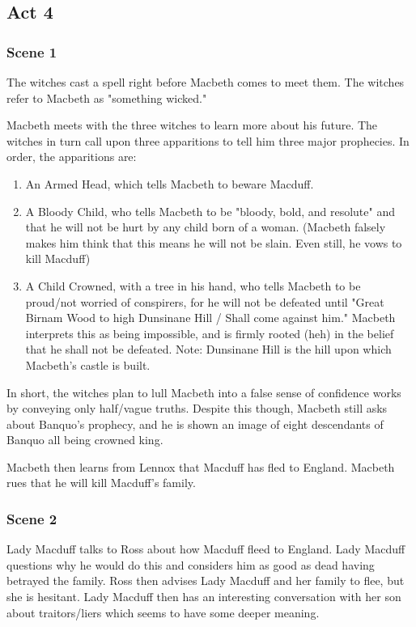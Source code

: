 \subsection{Act 4}

\subsubsection{Scene 1}

The witches cast a spell right before Macbeth comes to meet them. The witches refer to Macbeth as "something wicked."

Macbeth meets with the three witches to learn more about his future. The
witches in turn call upon three apparitions to tell him three major prophecies. In order, the apparitions are:
\begin{enumerate}
    \item An Armed Head, which tells Macbeth to beware Macduff.
    \item A Bloody Child, who tells Macbeth to be "bloody, bold, and resolute" and that he will not be hurt by any child born of a woman. (Macbeth falsely makes him think that this means he will not be slain. Even still, he vows to kill Macduff)
    \item A Child Crowned, with a tree in his hand, who tells Macbeth to be proud/not worried of conspirers, for he will not be defeated until "Great Birnam Wood to high Dunsinane Hill / Shall come against him." Macbeth interprets this as being impossible, and is firmly rooted (heh) in the belief that he shall not be defeated. Note: Dunsinane Hill is the hill upon which Macbeth's castle is built.
\end{enumerate}
In short, the witches plan to lull Macbeth into a false sense of confidence
works by conveying only half/vague truths. Despite this though, Macbeth still
asks about Banquo's prophecy, and he is shown an image of eight descendants of
Banquo all being crowned king.

Macbeth then learns from Lennox that Macduff has fled to England. Macbeth rues
that he will kill Macduff's family.

\subsubsection{Scene 2}

Lady Macduff talks to Ross about how Macduff fleed to England. Lady Macduff
questions why he would do this and considers him as good as dead having
betrayed the family. Ross then advises Lady Macduff and her family to flee, but
she is hesitant. Lady Macduff then has an interesting conversation with her son
about traitors/liers which seems to have some deeper meaning.

